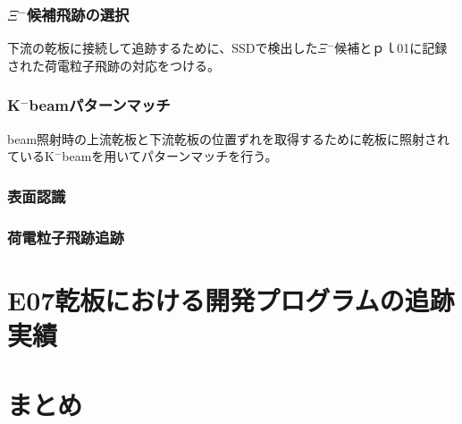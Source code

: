 \documentclass[12pt,a4paper]{jarticle}
\begin{document}
\subsubsection{$\Xi$$^-$候補飛跡の選択}
下流の乾板に接続して追跡するために、SSDで検出した$\Xi$$^-$候補とｐｌ01に記録された荷電粒子飛跡の対応をつける。
\subsubsection{K$^-$beamパターンマッチ}
beam照射時の上流乾板と下流乾板の位置ずれを取得するために乾板に照射されているK$^-$beamを用いてパターンマッチを行う。
\subsubsection{表面認識}
\subsubsection{荷電粒子飛跡追跡}

\newpage
\section{E07乾板における開発プログラムの追跡実績}

\newpage
\section{まとめ}
\end{document}
